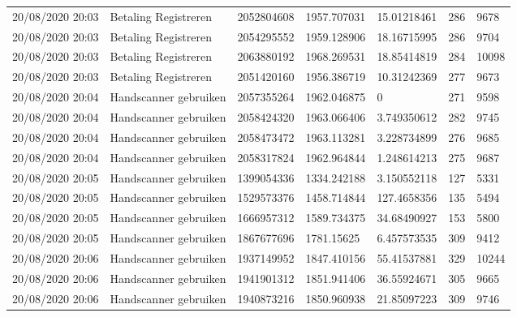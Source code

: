 \begin{tiny}
\begin{longtable}{lllllll}
    20/08/2020 20:03 & Betaling Registreren  & 2052804608        & 1957.707031 & 15.01218461           & 286              & 9678             \\
    20/08/2020 20:03 & Betaling Registreren  & 2054295552        & 1959.128906 & 18.16715995           & 286              & 9704             \\
    20/08/2020 20:03 & Betaling Registreren  & 2063880192        & 1968.269531 & 18.85414819           & 284              & 10098            \\
    20/08/2020 20:03 & Betaling Registreren  & 2051420160        & 1956.386719 & 10.31242369           & 277              & 9673             \\
    20/08/2020 20:04 & Handscanner gebruiken & 2057355264        & 1962.046875 & 0                     & 271              & 9598             \\
    20/08/2020 20:04 & Handscanner gebruiken & 2058424320        & 1963.066406 & 3.749350612           & 282              & 9745             \\
    20/08/2020 20:04 & Handscanner gebruiken & 2058473472        & 1963.113281 & 3.228734899           & 276              & 9685             \\
    20/08/2020 20:04 & Handscanner gebruiken & 2058317824        & 1962.964844 & 1.248614213           & 275              & 9687             \\
    20/08/2020 20:05 & Handscanner gebruiken & 1399054336        & 1334.242188 & 3.150552118           & 127              & 5331             \\
    20/08/2020 20:05 & Handscanner gebruiken & 1529573376        & 1458.714844 & 127.4658356           & 135              & 5494             \\
    20/08/2020 20:05 & Handscanner gebruiken & 1666957312        & 1589.734375 & 34.68490927           & 153              & 5800             \\
    20/08/2020 20:05 & Handscanner gebruiken & 1867677696        & 1781.15625  & 6.457573535           & 309              & 9412             \\
    20/08/2020 20:06 & Handscanner gebruiken & 1937149952        & 1847.410156 & 55.41537881           & 329              & 10244            \\
    20/08/2020 20:06 & Handscanner gebruiken & 1941901312        & 1851.941406 & 36.55924671           & 305              & 9665             \\
    20/08/2020 20:06 & Handscanner gebruiken & 1940873216        & 1850.960938 & 21.85097223           & 309              & 9746             \\

\end{longtable}
\end{tiny}
